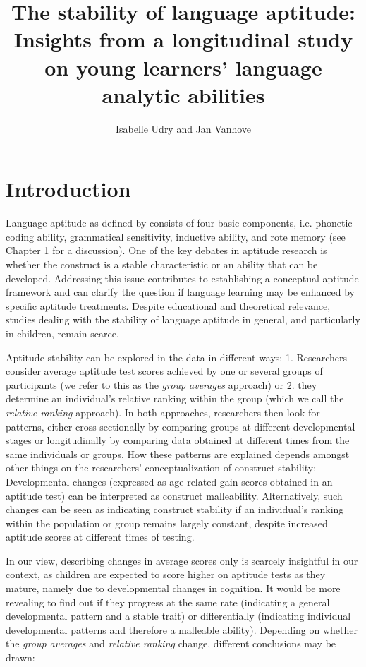 \documentclass[output=paper]{langsci/langscibook}
\author{Isabelle Udry\orcid{}\affiliation{University of Fribourg, Institut de Plurilinguisme; Zurich University of Teacher Education} and Jan Vanhove\orcid{}\affiliation{University of Fribourg, Institut de Plurilinguisme}}
\title[The stability of language aptitude]
      {The stability of language aptitude: Insights from a longitudinal study on young learners’ language analytic abilities}
\begin{document}
\maketitle 

\section{Introduction}

Language aptitude as defined by \citet{Carroll1958} consists of four basic components, i.e. phonetic coding ability, grammatical sensitivity, inductive ability, and rote memory (see Chapter 1 for a discussion). One of the key debates in aptitude research is whether the construct is a stable characteristic or an ability that can be developed. Addressing this issue contributes to establishing a conceptual aptitude framework and can clarify the question if language learning may be enhanced by specific aptitude treatments. Despite educational and theoretical relevance, studies dealing with the stability of language aptitude in general, and particularly in children, remain scarce. 

Aptitude stability can be explored in the data in different ways: 1. Researchers consider average aptitude test scores achieved by one or several groups of participants (we refer to this as the \textit{group averages} approach) or 2. they determine an individual’s relative ranking within the group (which we call the \textit{relative ranking} approach). In both approaches, researchers then look for patterns, either cross-sectionally by comparing groups at different developmental stages or longitudinally by comparing data obtained at different times from the same individuals or groups. How these patterns are explained depends amongst other things on the researchers’ conceptualization of construct stability: Developmental changes (expressed as age-related gain scores obtained in an aptitude test) can be interpreted as construct malleability. Alternatively, such changes can be seen as indicating construct stability if an individual’s ranking within the population or group remains largely constant, despite increased aptitude scores at different times of testing. 

In our view, describing changes in average scores only is scarcely insightful in our context, as children are expected to score higher on aptitude tests as they mature, namely due to developmental changes in cognition. It would be more revealing to find out if they progress at the same rate (indicating a general developmental pattern and a stable trait) or differentially (indicating individual developmental patterns and therefore a malleable ability). Depending on whether the \textit{group averages} and \textit{relative ranking} change, different conclusions may be drawn: 
\end{document}
